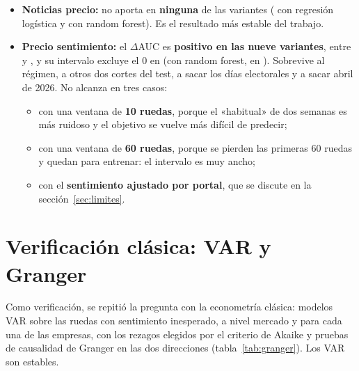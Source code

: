 \begin{itemize}
  \item \textbf{Noticias \flecha{} precio:} no aporta en \textbf{ninguna} de las variantes
        ( con regresión logística y
         con random forest). Es el resultado
        más estable del trabajo.
  \item \textbf{Precio \flecha{} sentimiento:} el $\Delta$AUC es \textbf{positivo en las nueve
        variantes}, entre  y
        , y su intervalo excluye el 0 en
         (con random forest, en
        ). Sobrevive al régimen, a otros
        dos cortes del test, a sacar los días electorales y a sacar abril de 2026. No alcanza en
        tres casos:
        \begin{itemize}
          \item con una ventana de \textbf{10 ruedas}, porque el «habitual» de dos semanas es más
                ruidoso y el objetivo se vuelve más difícil de predecir;
          \item con una ventana de \textbf{60 ruedas}, porque se pierden las primeras 60 ruedas y
                quedan  para entrenar: el
                intervalo es muy ancho;
          \item con el \textbf{sentimiento ajustado por portal}, que se discute en la
                sección~\ref{sec:limites}.
        \end{itemize}
\end{itemize}

\section{Verificación clásica: VAR y Granger}
\label{sec:verificacion}

Como verificación, se repitió la pregunta con la econometría clásica: modelos VAR sobre las
 ruedas con sentimiento inesperado, a nivel mercado y para cada
una de las  empresas, con los rezagos elegidos por el criterio de Akaike y
pruebas de causalidad de Granger en las dos direcciones (tabla~\ref{tab:granger}). Los
 VAR son estables.

